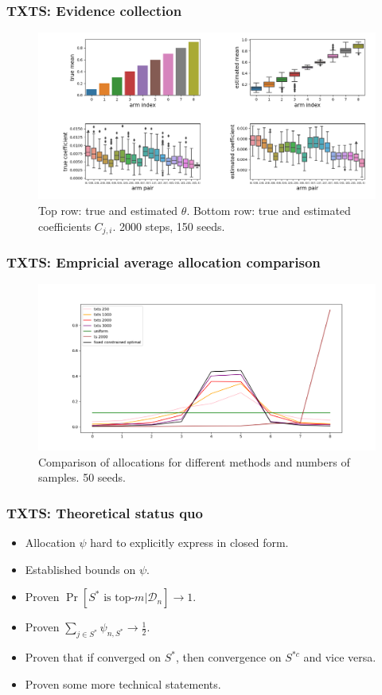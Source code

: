 \documentclass[aspectratio=43]{beamer}
\begin{document}
\begin{frame}
\frametitle{TXTS: Evidence collection}
\begin{figure}[h]
  \centering
  \includegraphics[width=\textwidth]{190909-coefficients_2000.png}
  \caption{Top row: true and estimated $\theta$. Bottom row: true and estimated
      coefficients $C_{j, i}$. 2000 steps, 150 seeds.}
  \label{fig:algorithm_coefficients}
\end{figure}
\end{frame}

\begin{frame}
\frametitle{TXTS: Empricial average allocation comparison}
\begin{figure}[h]
  \centering
  \includegraphics[width=\textwidth]{191127-allocations.png}
  \caption{Comparison of allocations for different methods and numbers of
      samples. 50 seeds.}
\end{figure}
\end{frame}

\begin{frame}
\frametitle{TXTS: Theoretical status quo}
\begin{itemize}[<+->]
  \item Allocation $\psi$ hard to explicitly express in closed form.
  \item Established bounds on $\psi$.
  \item Proven $\Pr[S^* \text{ is top-}m | \mathcal{D}_n] \rightarrow 1$.
  \item Proven $\sum_{j \in S^*} \psi_{n, S^*} \rightarrow \frac{1}{2}$.
  \item Proven that if converged on $S^*$, then convergence on $S^{*c}$ and
      vice versa.
  \item Proven some more technical statements.
\end{itemize}
\end{frame}
\end{document}
